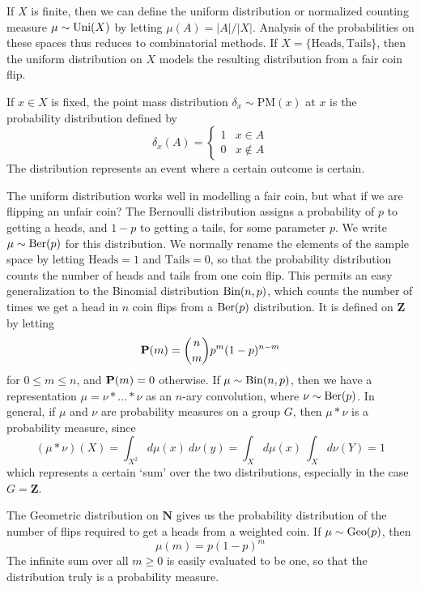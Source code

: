 \begin{example}
    If $X$ is finite, then we can define the uniform distribution or normalized counting measure $\mu \sim \operatorname{\text{Uni}}(X)$ by letting $\mu(A) = |A|/|X|$. Analysis of the probabilities on these spaces thus reduces to combinatorial methods. If $X = \{ \text{Heads}, \text{Tails} \}$, then the uniform distribution on $X$ models the resulting distribution from a fair coin flip.
\end{example}

\begin{example}
    If $x \in X$ is fixed, the point mass distribution $\delta_x \sim \text{PM}(x)$ at $x$ is the probability distribution defined by
    \[ \delta_x(A) = \begin{cases} 1 & x \in A \\ 0 & x \not \in A \end{cases} \]
    The distribution represents an event where a certain outcome is certain.
\end{example}

\begin{example}
    The uniform distribution works well in modelling a fair coin, but what if we are flipping an unfair coin? The Bernoulli distribution assigns a probability of $p$ to getting a heads, and $1-p$ to getting a tails, for some parameter $p$. We write $\mu \sim \operatorname{\text{Ber}}(p)$ for this distribution. We normally rename the elements of the sample space by letting $\text{Heads} = 1$ and $\text{Tails} = 0$, so that the probability distribution counts the number of heads and tails from one coin flip. This permits an easy generalization to the Binomial distribution $\operatorname{\text{Bin}}(n,p)$, which counts the number of times we get a head in $n$ coin flips from a $\operatorname{\text{Ber}}(p)$ distribution. It is defined on $\mathbf{Z}$ by letting
    \[ \operatorname{\mathbf{P}}(m) = \binom{n}{m} p^m (1-p)^{n-m} \]
    for $0 \leq m \leq n$, and $\operatorname{\mathbf{P}}(m) = 0$ otherwise. If $\mu \sim \operatorname{\text{Bin}}(n,p)$, then we have a representation $\mu = \nu * \dots * \nu$ as an $n$-ary convolution, where $\nu \sim \operatorname{\text{Ber}}(p)$. In general, if $\mu$ and $\nu$ are probability measures on a group $G$, then $\mu * \nu$ is a probability measure, since
    \[ (\mu * \nu)(X) = \int_{X^2} d\mu(x)\ d\nu(y) = \int_X d\mu(x) \ \int_X d\nu(Y) = 1 \]
    which represents a certain `sum' over the two distributions, especially in the case $G = \mathbf{Z}$.
\end{example}

\begin{example}
    The Geometric distribution on $\mathbf{N}$ gives us the probability distribution of the number of flips required to get a heads from a weighted coin. If $\mu \sim \operatorname{\text{Geo}}(p)$, then
    \[ \mu(m) = p (1-p)^m \]
    The infinite sum over all $m \geq 0$ is easily evaluated to be one, so that the distribution truly is a probability measure.
\end{example}

